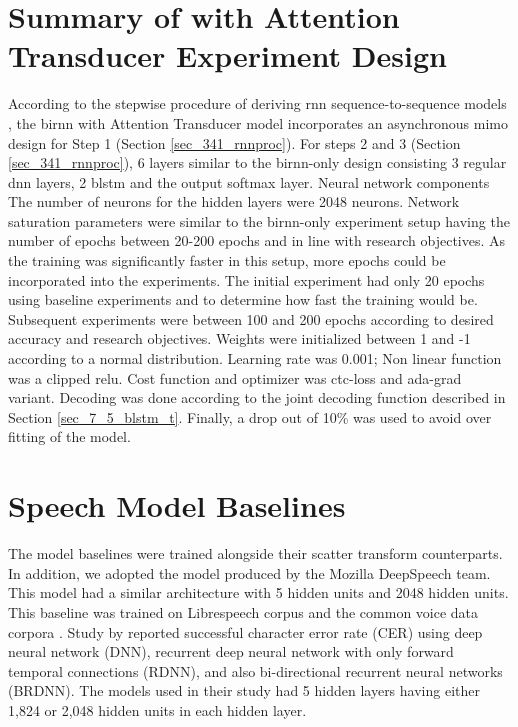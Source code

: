 {\section{Summary of  with Attention Transducer Experiment Design}
According to the stepwise procedure of deriving \acrshort{rnn} sequence-to-sequence models , the \acrshort{birnn} with Attention Transducer model incorporates an asynchronous \acrshort{mimo} design for Step 1 (Section \ref{sec_341_rnnproc}).  For steps 2 and 3 (Section \ref{sec_341_rnnproc}), 6 layers similar to the \acrshort{birnn}-only design consisting 3 regular \acrshort{dnn} layers, 2 \acrshort{blstm} and the output softmax layer. Neural network components  The number of neurons for the hidden layers were 2048 neurons.  Network saturation parameters were similar to the \acrshort{birnn}-only experiment setup having the number of epochs between 20-200 epochs and in line with research objectives.  As the training was significantly faster in this setup, more epochs could be incorporated into the experiments.  The initial experiment had only 20 epochs using baseline experiments and to determine how fast the training would be.  Subsequent experiments were between 100 and 200 epochs according to desired accuracy and research objectives.  Weights were initialized between 1 and -1 according to a normal distribution.  Learning rate was 0.001; Non linear function was a clipped \acrshort{relu}.  Cost function and optimizer was ctc-loss and ada-grad variant. Decoding was done according to the joint decoding function described in Section \ref{sec_7_5_blstm_t}.  Finally, a drop out of 10\% was used to avoid over fitting of the model.

\section{Speech Model Baselines}\label{sec_c7_baseline}
The model baselines were trained alongside their scatter transform counterparts.  In addition, we adopted the model produced by the Mozilla DeepSpeech team.  This model had a similar architecture with 5 hidden units and 2048 hidden units.  This baseline was trained on Librespeech corpus and the common voice data corpora \citep{panayotov2015librispeech, ardila2019common}.   Study by \cite{hannun2014first} reported successful character error rate (CER)  using deep neural network (DNN), recurrent deep neural network with only forward temporal connections (RDNN), and also bi-directional recurrent neural networks (BRDNN). The models used in their study had 5 hidden layers having either 1,824 or 2,048 hidden units in each hidden layer.  

}
